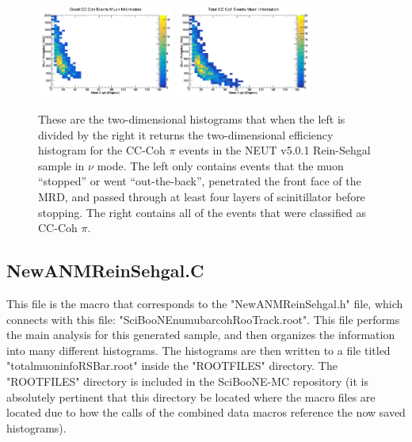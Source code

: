 \documentclass[11pt]{article}
\begin{document}
\begin{figure}[H]
\centering
\includegraphics[width=0.4\textwidth]{OldNMReinSehgalImages/7.png}
\includegraphics[width=0.4\textwidth]{OldNMReinSehgalImages/8.png}
\caption{These are the two-dimensional histograms that when the left is divided by the right it returns the two-dimensional efficiency histogram for the CC-Coh $\pi$ events in the NEUT v5.0.1 Rein-Sehgal sample in $\nu$ mode. The left only contains events that the muon ``stopped'' or went ``out-the-back'', penetrated the front face of the MRD, and passed through at least four layers of scinitillator before stopping. The right contains all of the events that were classified as CC-Coh $\pi$.}
\label{fig:app:NMCCCohMuon2DORS}
\end{figure}


\subsection{NewANMReinSehgal.C}
\label{sub:NewANMReinSehgal.C}
This file is the macro that corresponds to the "NewANMReinSehgal.h" file, which connects with this file: "SciBooNE\textunderscore numubar\textunderscore coh\textunderscore RooTrack.root". This file performs the main analysis for this generated sample, and then organizes the information into many different histograms. The histograms are then written to a file titled "totalmuoninfoRSBar.root" inside the "ROOTFILES" directory. The "ROOTFILES" directory is included in the SciBooNE-MC repository (it is absolutely pertinent that this directory be located where the macro files are located due to how the calls of the combined data macros reference the now saved histograms).
\end{document}

